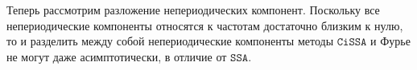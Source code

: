 \documentclass[12pt, specialist, subf
]{disser}
\theoremstyle{definition}
\newcommand{\SSA}{\texttt{SSA}}
\newcommand{\CISSA}{\texttt{CiSSA}}
\newcommand{\TS}{\mathsf{X}}
\begin{document}
Теперь рассмотрим разложение непериодических компонент. Поскольку все непериодические компоненты относятся к частотам достаточно близким к нулю, то и разделить между собой непериодические компоненты методы $\CISSA$ и Фурье не могут даже асимптотически, в отличие от $\SSA$.


%
%
%
%
%
%
%
\end{document}
